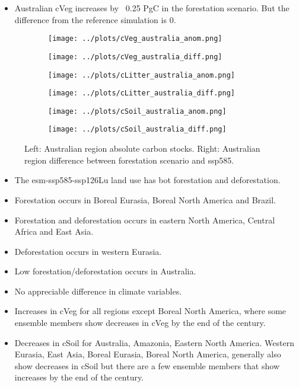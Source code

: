 \documentclass[]{article}
\begin{document}
\begin{itemize}
    \item Australian cVeg increases by ~0.25 PgC in the forestation scenario. But the difference from the reference simulation is 0.
\end{itemize}

\begin{figure}[H]
    \centering
    \begin{subfigure}[b]{0.4\linewidth}
        \texttt{[image: ../plots/cVeg\_australia\_anom.png]}
    \end{subfigure}
    \begin{subfigure}[b]{0.4\linewidth}
        \texttt{[image: ../plots/cVeg\_australia\_diff.png]}
    \end{subfigure}
    \begin{subfigure}[b]{0.4\linewidth}
        \texttt{[image: ../plots/cLitter\_australia\_anom.png]}
    \end{subfigure}
    \begin{subfigure}[b]{0.4\linewidth}
        \texttt{[image: ../plots/cLitter\_australia\_diff.png]}
    \end{subfigure}
    \begin{subfigure}[b]{0.4\linewidth}
        \texttt{[image: ../plots/cSoil\_australia\_anom.png]}
    \end{subfigure}
    \begin{subfigure}[b]{0.4\linewidth}
        \texttt{[image: ../plots/cSoil\_australia\_diff.png]}
    \end{subfigure}
    \caption{Left: Australian region absolute carbon stocks. Right: Australian region  difference between forestation scenario and ssp585.}
    \label{fig:aus_region}
\end{figure}

\begin{itemize}
    \item The esm-ssp585-ssp126Lu land use has bot forestation and deforestation.
    \item Forestation occurs in Boreal Eurasia, Boreal North America and Brazil.
    \item Forestation and deforestation occurs in eastern North America, Central Africa and East Asia.
    \item Deforestation occurs in western Eurasia.
    \item Low forestation/deforestation occurs in Australia.
    \item No appreciable difference in climate variables.
    \item Increases in cVeg for all regions except Boreal North America, where some ensemble members show decreases in cVeg by the end of the century.
    \item Decreases in cSoil for Australia, Amazonia, Eastern North America. Western Eurasia, East Asia, Boreal Eurasia, Boreal North America, generally also show decreases in cSoil but there are a few ensemble members that show increases by the end of the century.
\end{itemize}
\end{document}
